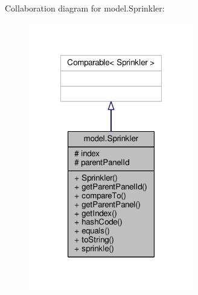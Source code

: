 Collaboration diagram for model.\-Sprinkler\-:\nopagebreak
\begin{figure}[H]
\begin{center}
\leavevmode
\includegraphics[width=204pt]{classmodel_1_1Sprinkler__coll__graph}
\end{center}
\end{figure}
